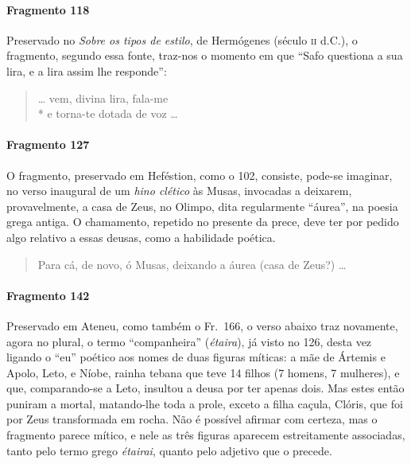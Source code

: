 \paragraph{Fragmento 118}

{\small Preservado no \textit{Sobre os tipos de estilo}, de Hermógenes (século \textsc{ii} d.C.),
o fragmento, segundo essa fonte, traz-nos o momento em que ``Safo
questiona a sua lira, e a lira assim lhe responde”:}

\begin{verse}
\ldots{} vem, divina lira, fala-me\\*
e torna-te dotada de voz \ldots{}
\end{verse}

\paragraph{Fragmento 127}

{\small O fragmento, preservado em Heféstion, como o 102, consiste, pode-se imaginar, no
verso inaugural de um \textit{hino clético }às Musas, invocadas a deixarem,
provavelmente, a casa de Zeus, no Olimpo, dita regularmente ``áurea”,
na poesia grega antiga. O chamamento, repetido no presente da prece, deve ter
por pedido algo relativo a essas deusas, como a habilidade poética.}

\begin{verse}
Para cá, de novo, ó Musas, deixando a áurea (casa de Zeus?) \ldots{}
\end{verse}

\paragraph{Fragmento 142}

{\small Preservado em Ateneu, como também o Fr.~166, o verso abaixo traz novamente,
agora no plural, o termo ``companheira” (\textit{étaira}), já visto no
126, desta vez ligando o “eu” poético aos nomes de duas figuras míticas: a mãe de
Ártemis e Apolo, Leto, e Níobe, rainha tebana que teve 14 filhos (7 homens, 7
mulheres), e que, comparando-se a Leto, insultou a deusa por ter apenas dois.
Mas estes então puniram a mortal, matando-lhe toda a prole, exceto a filha
caçula, Clóris, que foi por Zeus transformada em rocha. Não é possível afirmar
com certeza, mas o fragmento parece mítico, e nele as três figuras aparecem
estreitamente associadas, tanto pelo termo grego \textit{étairai}, quanto pelo
adjetivo que o precede.}


